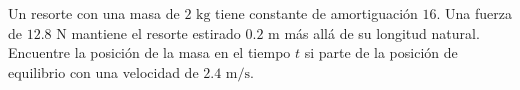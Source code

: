 \item Un resorte con una masa de $2 \text{ kg}$ tiene constante de amortiguación $16$. Una fuerza de $12.8 \text{ N}$ mantiene el resorte estirado $0.2 \text{ m}$ más allá de su longitud natural. Encuentre la posición de la masa en el tiempo $t$ si parte de la posición de equilibrio con una velocidad de $2.4 \text{ m/s}$.

